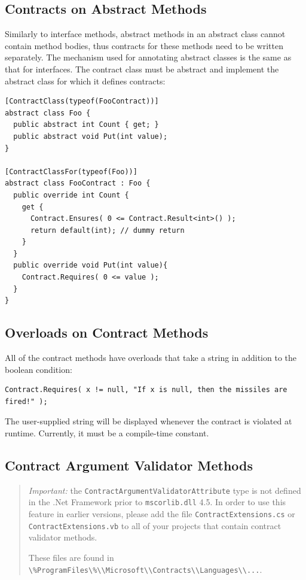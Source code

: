\documentclass{article}
\newcommand{\code}[1]{\lstinline{#1}}
\begin{document}
\subsection{Contracts on Abstract Methods}
\label{sec:abstractmethodcontracts}
Similarly to interface methods, abstract methods in an abstract class
cannot contain method bodies, thus contracts for these methods need to
be written separately. The  mechanism used for annotating abstract
classes is the same as that for interfaces. The contract class must
be abstract and implement the abstract class for which it
defines contracts:
\begin{lstlisting}
[ContractClass(typeof(FooContract))]
abstract class Foo {
  public abstract int Count { get; } 
  public abstract void Put(int value);
}

[ContractClassFor(typeof(Foo))]
abstract class FooContract : Foo { 
  public override int Count { 
    get { 
      Contract.Ensures( 0 <= Contract.Result<int>() ); 
      return default(int); // dummy return
    }
  }
  public override void Put(int value){
    Contract.Requires( 0 <= value ); 
  }
}
\end{lstlisting}





\subsection{Overloads on Contract Methods}
\label{sec:methodcontractoverloads}
All of the contract methods have overloads that take a string in addition to the
boolean condition:
\begin{lstlisting}
Contract.Requires( x != null, "If x is null, then the missiles are fired!" );
\end{lstlisting}
The user-supplied string will be displayed whenever the contract is violated at runtime.
Currently, it must be a compile-time constant.

\subsection{Contract Argument Validator Methods}
\label{sec:contractargumentvalidators}

\begin{quote}
\emph{Important:} the \code{ContractArgumentValidatorAttribute} type
is not defined in the .Net Framework prior to \code{mscorlib.dll} 4.5. In order to use this
feature in earlier versions, please add the file \code{ContractExtensions.cs} or
\code{ContractExtensions.vb} to all of your projects that contain
contract validator methods.

\noindent
These files are found in \code{\%ProgramFiles\%\\Microsoft\\Contracts\\Languages\\...}.
\end{quote}
\end{document}

